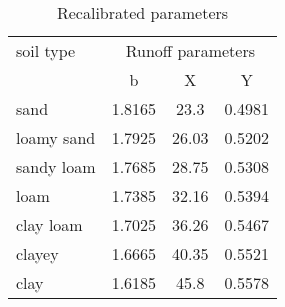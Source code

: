\begin{table}[htbp]
  \centering
  \caption{Recalibrated parameters \citep{KavkaDisertace}}
    \begin{tabular}{lccc}
    \hline  \hline    
     soil type   &  \multicolumn{3}{c}{Runoff parameters}\\
     & \multicolumn{1}{c}{b} & \multicolumn{1}{c}{X} & \multicolumn{1}{c}{Y} \\
    \hline     
%     
    sand & 1.8165 & 23.3  & 0.4981 \\
    loamy sand & 1.7925 & 26.03 & 0.5202 \\
    sandy loam & 1.7685 & 28.75 & 0.5308 \\
    loam & 1.7385 & 32.16 & 0.5394 \\
    clay loam & 1.7025 & 36.26 & 0.5467 \\
    clayey & 1.6665 & 40.35 & 0.5521 \\
    clay   & 1.6185 & 45.8  & 0.5578 \\
    \hline   \hline    
    \end{tabular}%
  \label{tab:addlabel}%
\end{table}%
 